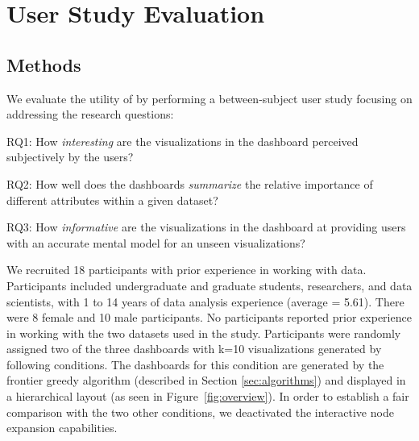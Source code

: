 \section{User Study Evaluation\label{sec:userstudy}}
\subsection{Methods}
We evaluate the utility of \system by performing a between-subject user study focusing on addressing the research questions:
\begin{denselist}
	\item RQ1: How \textit{interesting} are the visualizations in the dashboard perceived subjectively by the users?
	\item RQ2: How well does the dashboards \textit{summarize} the relative importance of different attributes within a given dataset?
	\item RQ3: How \textit{informative} are the visualizations in the dashboard at providing users with an accurate mental model for an unseen visualizations? %
\end{denselist}
We recruited 18 participants with prior experience in working with data. Participants included undergraduate and graduate students, researchers, and data scientists, with 1 to 14 years of data analysis experience (average = 5.61).  %
There were 8 female and 10 male participants. No participants reported prior experience in working with the two datasets used in the study. Participants were randomly assigned two of the three dashboards with k=10 visualizations generated by following conditions. 
\stitle{\system:} The dashboards for this condition are generated by the frontier greedy algorithm (described in Section \ref{sec:algorithms}) and displayed in a hierarchical layout (as seen in Figure~\ref{fig:overview}). In order to establish a fair comparison with the two other conditions, we deactivated the interactive node expansion capabilities.
